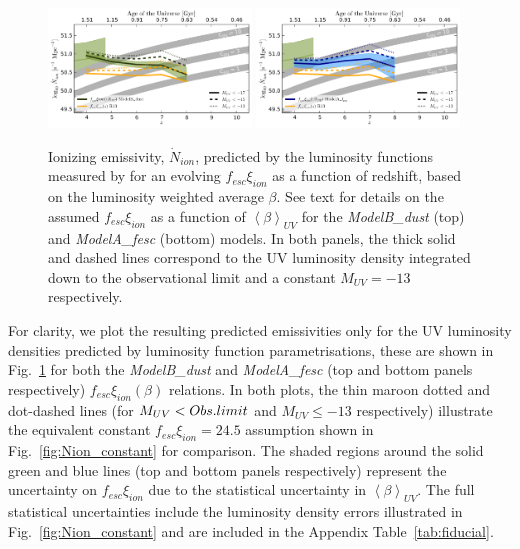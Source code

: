 \begin{figure}
  \includegraphics[width=0.48\textwidth]{plots/Fig9a.pdf}
  \includegraphics[width=0.48\textwidth]{plots/Fig9b.pdf}
  \caption{Ionizing emissivity, $\dot{N}_{ion}$, predicted by the luminosity functions measured by \citet{Bouwens:2014tx} for an evolving $f_{esc}\xi_{ion}$ as a function of redshift, based on the luminosity weighted average $\beta$. See text for details on the assumed $f_{esc}\xi_{ion}$ as a function of $\left \langle \beta  \right \rangle_{UV}$ for the \emph{ModelB\_dust} (top) and \emph{ModelA\_fesc} (bottom) models. In both panels, the thick solid and dashed lines correspond to the UV luminosity density integrated down to the observational limit and a constant $M_{UV} = -13$ respectively.}
  \label{fig:Nion_xi_kappa_z}
\end{figure}

For clarity, we plot the resulting predicted emissivities only for the UV luminosity densities predicted by \citet{Bouwens:2014tx} luminosity function parametrisations, these are shown in Fig.~\ref{fig:Nion_xi_kappa_z} for both the \emph{ModelB\_dust} and \emph{ModelA\_fesc} (top and bottom panels respectively) $f_{esc}\xi_{ion}(\beta)$ relations. In both plots, the thin maroon dotted and dot-dashed lines (for $M_{UV} < Obs.\/limit$ and $M_{UV} \leq -13$ respectively) illustrate the equivalent constant $f_{esc}\xi_{ion} = 24.5$ assumption shown in Fig.~\ref{fig:Nion_constant} for comparison. The shaded regions around the solid green and blue lines (top and bottom panels respectively) represent the uncertainty on $f_{esc}\xi_{ion}$ due to the statistical uncertainty in $\left \langle \beta  \right \rangle_{UV}$. The full statistical uncertainties include the luminosity density errors illustrated in Fig.~\ref{fig:Nion_constant} and are included in the Appendix Table~\ref{tab:fiducial}.

